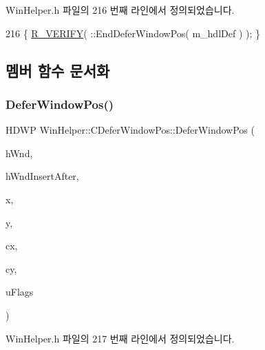 Win\+Helper.\+h 파일의 216 번째 라인에서 정의되었습니다.


\begin{DoxyCode}
216 \{ \mbox{\hyperlink{_win_helper_8h_ad8c3ff6961ffa02071ec0597124f3466}{R\_VERIFY}}( ::EndDeferWindowPos( m\_hdlDef ) ); \}
\end{DoxyCode}


\subsection{멤버 함수 문서화}
\mbox{\label{class_win_helper_1_1_c_defer_window_pos_a50e9a5dfc382996381a506d66f94efd6}} 
\subsubsection{\texorpdfstring{Defer\+Window\+Pos()}{DeferWindowPos()}\hspace{0.1cm}{\footnotesize\ttfamily [1/2]}}
{\footnotesize\ttfamily H\+D\+WP Win\+Helper\+::\+C\+Defer\+Window\+Pos\+::\+Defer\+Window\+Pos (\begin{DoxyParamCaption}\item[{H\+W\+ND}]{h\+Wnd,  }\item[{H\+W\+ND}]{h\+Wnd\+Insert\+After,  }\item[{\mbox{\hyperlink{_util_8cpp_a0ef32aa8672df19503a49fab2d0c8071}{int}}}]{x,  }\item[{\mbox{\hyperlink{_util_8cpp_a0ef32aa8672df19503a49fab2d0c8071}{int}}}]{y,  }\item[{\mbox{\hyperlink{_util_8cpp_a0ef32aa8672df19503a49fab2d0c8071}{int}}}]{cx,  }\item[{\mbox{\hyperlink{_util_8cpp_a0ef32aa8672df19503a49fab2d0c8071}{int}}}]{cy,  }\item[{U\+I\+NT}]{u\+Flags }\end{DoxyParamCaption})\hspace{0.3cm}{\ttfamily [inline]}}



Win\+Helper.\+h 파일의 217 번째 라인에서 정의되었습니다.


